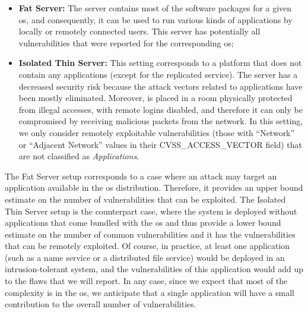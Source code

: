 \begin{itemize}

\item \textbf{Fat Server:} The server contains most of the software packages for a given \gls{os}, and consequently, it can be used to run various kinds of applications by locally or remotely connected users. This server has potentially all vulnerabilities that were reported for the corresponding \gls{os};


\item \textbf{Isolated Thin Server:} This setting corresponds to a platform that does not contain any applications (except for the replicated service). 
The server has a decreased security risk because the attack vectors related to applications have been mostly eliminated. 
Moreover, is placed in a room physically protected from illegal accesses, with remote logins disabled, and therefore it can only be compromised by receiving malicious packets from the network. In this setting, we only consider remotely exploitable vulnerabilities (those with ``Network'' or ``Adjacent Network'' values in their CVSS\_ACCESS\_VECTOR field) that are not classified as \textit{Applications}.

\end{itemize}

The Fat Server setup corresponds to a case where an attack may target an application available in the \gls{os} distribution. 
Therefore, it provides an upper bound estimate on the number of vulnerabilities that can be exploited. 
The Isolated Thin Server setup is the counterpart case, where the system is deployed without applications that come bundled with the \gls{os} and thus provide a lower bound estimate on the number of common vulnerabilities and it has the vulnerabilities that can be remotely exploited. 
Of course, in practice, at least one application (such as a name service or a distributed file service) would be deployed in an intrusion-tolerant system, and the vulnerabilities of this application would add up to the flaws that we will report. 
In any case, since we expect that most of the complexity is in the \gls{os}, we anticipate that a single application will have a small contribution to the overall number of vulnerabilities.



